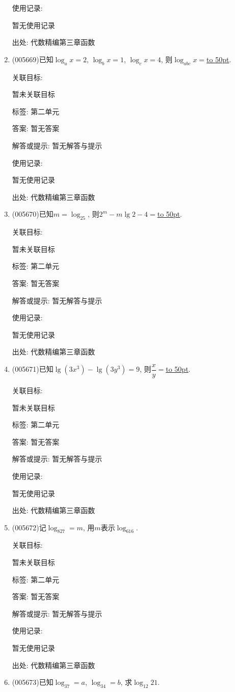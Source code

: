\documentclass[10pt,a4paper]{article}
\newcommand{\blank}[1]{\underline{\hbox to #1pt{}}}
\begin{document}
\begin{enumerate}[1.]
使用记录:

暂无使用记录


出处: 代数精编第三章函数
\item { (005669)}已知$\log_ax=2$, $\log_bx=1$, $\log_cx=4$, 则$\log_{abc}x=$\blank{50}.


关联目标:

暂未关联目标



标签: 第二单元

答案: 暂无答案

解答或提示: 暂无解答与提示

使用记录:

暂无使用记录


出处: 代数精编第三章函数
\item { (005670)}已知$m=\log_25$, 则$2^m-m\lg 2-4=$\blank{50}.


关联目标:

暂未关联目标



标签: 第二单元

答案: 暂无答案

解答或提示: 暂无解答与提示

使用记录:

暂无使用记录


出处: 代数精编第三章函数
\item { (005671)}已知$\lg (3x^3)-\lg (3y^3)=9$, 则$\dfrac xy=$\blank{50}.


关联目标:

暂未关联目标



标签: 第二单元

答案: 暂无答案

解答或提示: 暂无解答与提示

使用记录:

暂无使用记录


出处: 代数精编第三章函数
\item { (005672)}记$\log_827=m$, 用$m$表示$\log_616$.


关联目标:

暂未关联目标



标签: 第二单元

答案: 暂无答案

解答或提示: 暂无解答与提示

使用记录:

暂无使用记录


出处: 代数精编第三章函数
\item { (005673)}已知$\log_37=a$, $\log_34=b$, 求$\log_{12}21$.



\end{enumerate}
\end{document}
